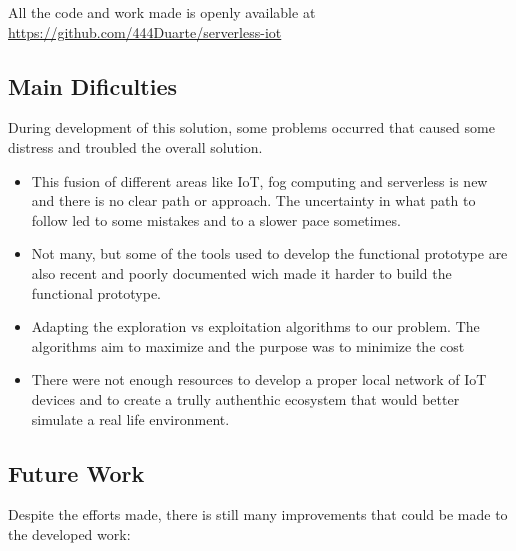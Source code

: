 \documentclass[conference]{IEEEtran}
\begin{document}
All the code and work made is openly available at \url{https://github.com/444Duarte/serverless-iot}

\subsection{Main Dificulties}
During development of this solution, some problems occurred that caused some distress and
troubled the overall solution.

\begin{itemize}
\item This fusion of different areas like IoT, fog computing and serverless is new
    and there is no clear path or approach. The uncertainty in what path to follow
    led to some mistakes and to a slower pace sometimes.

\item Not many, but some of the tools used to develop the functional prototype are
    also recent and poorly documented wich made it harder to build the functional
    prototype.

\item Adapting the exploration vs exploitation algorithms to our problem. The
    algorithms aim to maximize and the purpose was to minimize the cost

\item There were not enough resources to develop a proper local network of IoT
    devices and to create a trully authenthic ecosystem that would better simulate
    a real life environment.

\end{itemize}


\subsection{Future Work}
Despite the efforts made, there is still many improvements that could be made to
the developed work:
\end{document}
